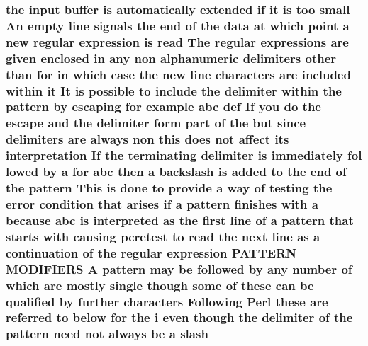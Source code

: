 \subsubsection[{\texorpdfstring{slash}{slash}}]{\setlength{\rightskip}{0pt plus 5cm}the {\bf input} {\bf buffer} {\bf is} automatically extended {\bf if} {\bf it} {\bf is} too small An {\bf empty} {\bf line} signals the {\bf end} {\bf of} the {\bf data} at {\bf which} {\bf point} {\bf a} new regular {\bf expression} {\bf is} {\bf read} The regular {\bf expressions} {\bf are} {\bf given} enclosed {\bf in} {\bf any} non {\bf alphanumeric} delimiters other {\bf than} for {\bf in} {\bf which} {\bf case} the new {\bf line} {\bf characters} {\bf are} {\bf included} within {\bf it} It {\bf is} {\bf possible} {\bf to} {\bf include} the delimiter within the {\bf pattern} by escaping for {\bf example} {\bf abc} def If you {\bf do} the escape and the delimiter form part {\bf of} the but since delimiters {\bf are} always non {\bf this} does {\bf not} affect its interpretation If the terminating delimiter {\bf is} immediately fol lowed by {\bf a} for {\bf abc} then {\bf a} {\bf backslash} {\bf is} added {\bf to} the {\bf end} {\bf of} the {\bf pattern} This {\bf is} {\bf done} {\bf to} provide {\bf a} {\bf way} {\bf of} testing the {\bf error} condition that {\bf arises} {\bf if} {\bf a} {\bf pattern} finishes {\bf with} {\bf a} because {\bf abc} {\bf is} interpreted {\bf as} the {\bf first} {\bf line} {\bf of} {\bf a} {\bf pattern} that starts {\bf with} causing {\bf pcretest} {\bf to} {\bf read} the next {\bf line} {\bf as} {\bf a} continuation {\bf of} the regular {\bf expression} P\+A\+T\+T\+E\+RN M\+O\+D\+I\+F\+I\+E\+RS {\bf A} {\bf pattern} may {\bf be} followed by {\bf any} {\bf number} {\bf of} {\bf which} {\bf are} mostly single {\bf though} some {\bf of} these {\bf can} {\bf be} qualified by further {\bf characters} Following {\bf Perl} these {\bf are} referred {\bf to} {\bf below} for the {\bf i} even {\bf though} the delimiter {\bf of} the {\bf pattern} need {\bf not} always {\bf be} {\bf a} slash}\hypertarget{pcretest_8txt_adf3048bc6e5304bb6cb119889b935ca4}{}\label{pcretest_8txt_adf3048bc6e5304bb6cb119889b935ca4}
